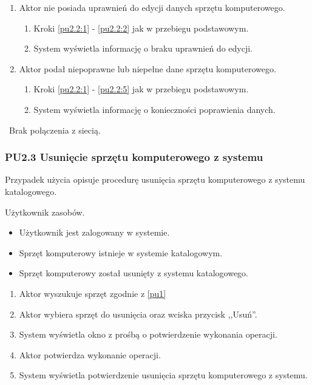 \begin{enumerate}
\item Aktor nie posiada uprawnień do edycji danych sprzętu komputerowego.
	\begin{enumerate}[label*=\arabic*.]
		\item Kroki \ref{pu2.2:1} - \ref{pu2.2:2} jak w przebiegu podstawowym.
		\item System wyświetla informację o braku uprawnień do edycji.
	\end{enumerate}
\item Aktor podał niepoprawne lub niepełne dane sprzętu komputerowego.
	\begin{enumerate}[label*=\arabic*.]
		\item Kroki \ref{pu2.2:1} - \ref{pu2.2:5} jak w przebiegu podstawowym.
		\item System wyświetla informację o konieczności poprawienia danych.
	\end{enumerate}
\end{enumerate}

\
Brak połączenia z siecią.

\subsubsection{PU2.3 Usunięcie sprzętu komputerowego z systemu}

Przypadek użycia opisuje procedurę usunięcia sprzętu komputerowego z systemu katalogowego.

Użytkownik zasobów.

\begin{itemize}
\item Użytkownik jest zalogowany w systemie.
\item Sprzęt komputerowy istnieje w systemie katalogowym.
\end{itemize}

\begin{itemize}
\item Sprzęt komputerowy został usunięty z systemu katalogowego.
\end{itemize}

\begin{enumerate}
\item \label{pu2.3:1} Aktor wyszukuje sprzęt zgodnie z \ref{pu1}
\item \label{pu2.3:2} Aktor wybiera sprzęt do usunięcia oraz wciska przycisk ,,Usuń''.
\item System wyświetla okno z prośbą o potwierdzenie wykonania operacji.
\item Aktor potwierdza wykonanie operacji.
\item System wyświetla potwierdzenie usunięcia sprzętu komputerowego z systemu.
\end{enumerate}

